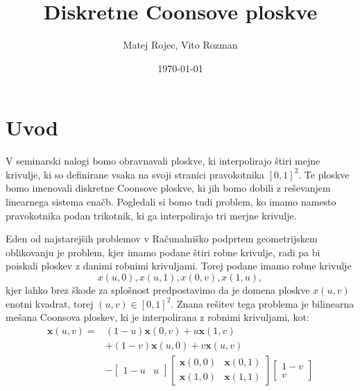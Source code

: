 \documentclass[a4paper,12pt]{article}
\begin{document}
\newcommand{\N}{\mathbb{N}}
\newcommand{\R}{\mathbb{R}}
\newcommand\sbullet[1][.5]{\mathbin{\vcenter{\hbox{\scalebox{#1}{$\bullet$}}}}}
\newtheorem{definicija}{Definicija}[section]
\newtheorem{primer}[definicija]{Primer}
\newtheorem{opomba}[definicija]{Opomba}

\title{Diskretne Coonsove ploskve}
\author{Matej Rojec, Vito Rozman}
\date{\today}

\maketitle


\newpage

\tableofcontents
\listoffigures

\newpage

\section{Uvod}

V seminarski nalogi bomo obravnavali ploskve, ki interpolirajo štiri mejne krivulje,
ki so definirane vsaka na svoji stranici pravokotnika $[0,1]^2$. 
Te ploskve bomo imenovali diskretne Coonsove ploskve, 
ki jih bomo dobili z reševanjem linearnega sistema enačb.
Pogledali si bomo tudi problem, ko imamo namesto pravokotnika podan 
trikotnik, ki ga interpolirajo tri merjne krivulje.

Eden od najstarejših problemov v Računalniško podprtem geometrijskem oblikovanju je problem, 
kjer imamo podane štiri robne krivulje, radi pa bi poiskali ploskev z danimi robnimi krivuljami. 
Torej podane imamo robne krivulje $$x(u,0), x(u,1), x(0,v),  x(1,u),$$ kjer lahko brez škode za 
splošnost predpostavimo da je domena ploskve $x(u,v)$ enotni kvadrat, torej $(u,v) \in [0,1]^2$. 
Znana rešitev tega problema je bilinearna mešana Coonsova ploskev, ki je interpolirana z robnimi 
krivuljami, kot: 
\begin{align*}
   \label{continiusCons}
   \mathbf{x}(u,v) =& (1-u)\mathbf{x}(0,v) +u\mathbf{x}(1,v)\\
    & + (1-v)\mathbf{x}(u,0) +v\mathbf{x}(u,v) \\
   & - 
   \begin{bmatrix} 
      1-u & u 
   \end{bmatrix}
   \begin{bmatrix} 
      \mathbf{x}(0,0)& \mathbf{x}(0,1)\\
      \mathbf{x}(1,0)& \mathbf{x}(1,1) 
   \end{bmatrix}
   \begin{bmatrix}
      1-v\\
      v
   \end{bmatrix}
\end{align*}
\end{document}
